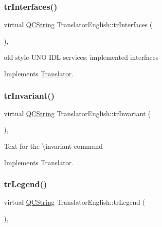 \subsubsection{\texorpdfstring{trInterfaces()}{trInterfaces()}}
{\footnotesize\ttfamily virtual \mbox{\hyperlink{class_q_c_string}{Q\+C\+String}} Translator\+English\+::tr\+Interfaces (\begin{DoxyParamCaption}{ }\end{DoxyParamCaption})\hspace{0.3cm}{\ttfamily [inline]}, {\ttfamily [virtual]}}

old style U\+NO I\+DL services\+: implemented interfaces 

Implements \mbox{\hyperlink{class_translator}{Translator}}.

\mbox{\label{class_translator_english_a7df2a33f5fbcd874edc1402391f2dc85}} 
\subsubsection{\texorpdfstring{trInvariant()}{trInvariant()}}
{\footnotesize\ttfamily virtual \mbox{\hyperlink{class_q_c_string}{Q\+C\+String}} Translator\+English\+::tr\+Invariant (\begin{DoxyParamCaption}{ }\end{DoxyParamCaption})\hspace{0.3cm}{\ttfamily [inline]}, {\ttfamily [virtual]}}

Text for the \textbackslash{}invariant command 

Implements \mbox{\hyperlink{class_translator}{Translator}}.

\mbox{\label{class_translator_english_ad120cf8a81b69b8b49f93493a8e2aa34}} 
\subsubsection{\texorpdfstring{trLegend()}{trLegend()}}
{\footnotesize\ttfamily virtual \mbox{\hyperlink{class_q_c_string}{Q\+C\+String}} Translator\+English\+::tr\+Legend (\begin{DoxyParamCaption}{ }\end{DoxyParamCaption})\hspace{0.3cm}{\ttfamily [inline]}, {\ttfamily [virtual]}}

